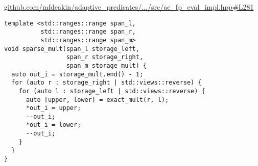 \href{https://github.com/mfdeakin/adaptive_predicates/blob/1caf304d6c502e619bcabdf51ab8696d52cff232/src/ae_fp_eval_impl.hpp#L281}{github.com/mfdeakin/adaptive\_predicates/.../src/ae\_fp\_eval\_impl.hpp\#L281}
\begin{lstlisting}[basicstyle=\small\ttfamily]
template <std::ranges::range span_l,
          std::ranges::range span_r,
          std::ranges::range span_m>
void sparse_mult(span_l storage_left,
                 span_r storage_right,
                 span_m storage_mult) {
  auto out_i = storage_mult.end() - 1;
  for (auto r : storage_right | std::views::reverse) {
    for (auto l : storage_left | std::views::reverse) {
      auto [upper, lower] = exact_mult(r, l);
      *out_i = upper;
      --out_i;
      *out_i = lower;
      --out_i;
    }
  }
}
\end{lstlisting}
